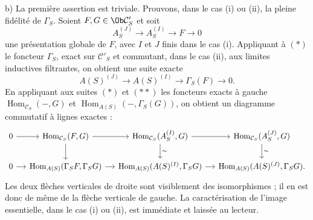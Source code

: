 \documentclass[11pt]{article}
\begin{document}
b) La première assertion est triviale. Prouvons, dans le cas (i) ou (ii), la pleine fidélité de $\Gamma_S$. Soient $F,G\in\Ob\mathcal C'_S$ et soit
\[
A_S^{(J)}\longrightarrow A_S^{(I)}\longrightarrow F\longrightarrow0
\tag{$*$}
\]
une présentation globale de $F$, avec $I$ et $J$ finis dans le cas (i). Appliquant à $(*)$ le foncteur $\Gamma_S$, exact sur $\mathcal C'_S$ et commutant, dans le cas (ii), aux limites inductives filtrantes, on obtient une suite exacte
\[
A(S)^{(J)}\longrightarrow A(S)^{(I)}\longrightarrow\Gamma_S(F)\longrightarrow0.
\tag{$**$}
\]
En appliquant aux suites $(*)$ et $(**)$ les foncteurs exacts à gauche $\operatorname{Hom}_{\mathcal C_S}(-,G)$ et $\operatorname{Hom}_{A(S)}(-,\Gamma_S(G))$, on obtient un diagramme commutatif à lignes exactes :
\[
\begin{tikzcd}[column sep=small]
0 \arrow[r] & \operatorname{Hom}_{\mathcal C_S}(F,G) \arrow[r] \arrow[d] &
\operatorname{Hom}_{\mathcal C_S}(A_S^{(I)},G) \arrow[r] \arrow[d,"\sim"] &
\operatorname{Hom}_{\mathcal C_S}(A_S^{(J)},G) \arrow[d,"\sim"] \\
0 \arrow[r] & \operatorname{Hom}_{A(S)}(\Gamma_SF,\Gamma_SG) \arrow[r] &
\operatorname{Hom}_{A(S)}(A(S)^{(I)},\Gamma_SG) \arrow[r] &
\operatorname{Hom}_{A(S)}(A(S)^{(J)},\Gamma_SG).
\end{tikzcd}
\]
Les deux flèches verticales de droite sont visiblement des isomorphismes ; il en est donc de même de la flèche verticale de gauche. La caractérisation de l'image essentielle, dans le cas (i) ou (ii), est immédiate et laissée au lecteur.
\end{document}
